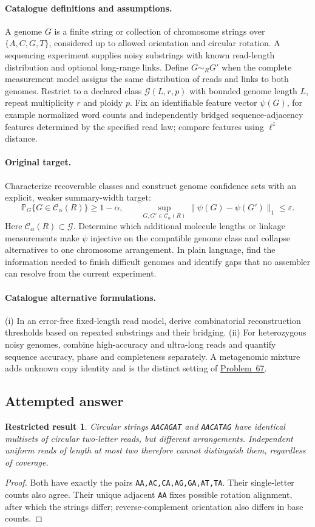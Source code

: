 \documentclass[11pt]{article}
\newcommand{\Prob}{\mathbb P}
\providecommand{\Prob}{\mathbb P}
\newtheorem{attemptresult}{Restricted result}[section]
\begin{document}
\paragraph{Catalogue definitions and assumptions.}
A genome $G$ is a finite string or collection of chromosome strings over $\{A,C,G,T\}$, considered up to allowed orientation and circular rotation. A sequencing experiment supplies noisy substrings with known read-length distribution and optional long-range links. Define $G\sim_R G'$ when the complete measurement model assigns the same distribution of reads and links to both genomes. Restrict to a declared class $\mathcal G(L,r,p)$ with bounded genome length $L$, repeat multiplicity $r$ and ploidy $p$. Fix an identifiable feature vector $\psi(G)$, for example normalized word counts and independently bridged sequence-adjacency features determined by the specified read law; compare features using $\ell^1$ distance.
\paragraph{Original target.}
Characterize recoverable classes and construct genome confidence sets with an explicit, weaker summary-width target:
\[\Prob_G\{G\in\mathcal C_\alpha(R)\}\ge1-\alpha,\qquad \sup_{G,G'\in\mathcal C_\alpha(R)}\|\psi(G)-\psi(G')\|_1\le\varepsilon.\]
Here $\mathcal C_\alpha(R)\subset\mathcal G$. Determine which additional molecule lengths or linkage measurements make $\psi$ injective on the compatible genome class and collapse alternatives to one chromosome arrangement. In plain language, find the information needed to finish difficult genomes and identify gaps that no assembler can resolve from the current experiment.
\paragraph{Catalogue alternative formulations.}
(i) In an error-free fixed-length read model, derive combinatorial reconstruction thresholds based on repeated substrings and their bridging. (ii) For heterozygous noisy genomes, combine high-accuracy and ultra-long reads and quantify sequence accuracy, phase and completeness separately. A metagenomic mixture adds unknown copy identity and is the distinct setting of \href{https://we-solve.github.io/problems/metagenome-reconstruction-cd5cc3b2/}{Problem~67}.
\subsection{Attempted answer}
\begin{attemptresult}
Circular strings \texttt{AACAGAT} and \texttt{AACATAG} have identical multisets of circular two-letter reads, but different arrangements. Independent uniform reads of length at most two therefore cannot distinguish them, regardless of coverage.
\end{attemptresult}
\begin{proof}
Both have exactly the pairs \texttt{AA,AC,CA,AG,GA,AT,TA}. Their single-letter counts also agree. Their unique adjacent \texttt{AA} fixes possible rotation alignment, after which the strings differ; reverse-complement orientation also differs in base counts.
\end{proof}
\end{document}
